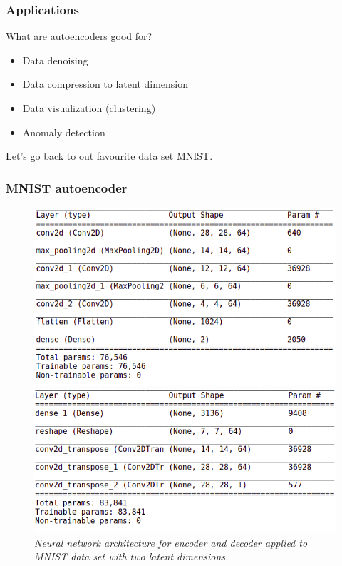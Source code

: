 \documentclass{beamer}
\newcommand{\bi}{\begin{itemize}}
\newcommand{\ei}{\end{itemize}}
\begin{document}
\begin{frame}
\frametitle{Applications}
What are autoencoders good for?
\bi
\item Data denoising
\item Data compression to latent dimension
\item Data visualization (clustering)
\item Anomaly detection
\ei
Let's go back to out favourite data set MNIST.
\end{frame}

\begin{frame}
\frametitle{MNIST autoencoder}
\begin{figure}
\begin{minipage}{0.45\linewidth}
	\includegraphics[scale=0.24]{mnist_ae_encoder.png}
\end{minipage}
\begin{minipage}{0.45\linewidth}
	\includegraphics[scale=0.24]{mnist_ae_decoder.png}
\end{minipage}
	\caption{\it Neural network architecture for encoder and decoder applied to MNIST data set with two latent dimensions.}
\end{figure}
\end{frame}
\end{document}
